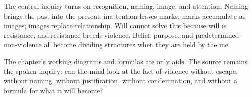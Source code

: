 The central inquiry turns on recognition, naming, image, and attention. Naming brings the past into the present; inattention leaves marks; marks accumulate as images; images replace relationship. Will cannot solve this because will is resistance, and resistance breeds violence. Belief, purpose, and predetermined non-violence all become dividing structures when they are held by the me.

The chapter's working diagrams and formulas are only aids. The source remains the spoken inquiry: can the mind look at the fact of violence without escape, without naming, without justification, without condemnation, and without a formula for what it will become?
